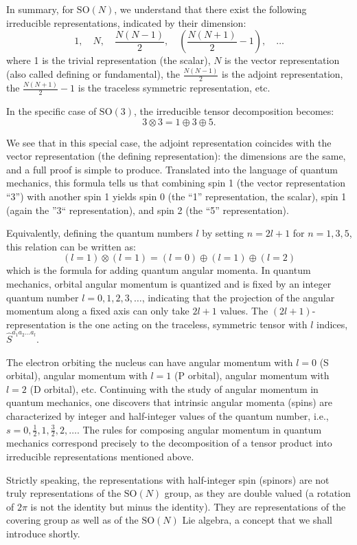 In summary, for \(\mathrm{SO}(N)\), we understand that there exist the following irreducible representations, indicated by their dimension:
\[
    1, \quad N, \quad \frac{N(N-1)}{2}, \quad \left( \frac{N(N+1)}{2} - 1 \right), \quad \ldots
\]
where 1 is the trivial representation (the scalar), \(N\) is the vector representation (also called defining or fundamental), the \(\frac{N(N-1)}{2}\) is the adjoint representation, the \(\frac{N(N+1)}{2} - 1\) is the traceless symmetric representation, etc.

\begin{example}
    In the specific case of \(\mathrm{SO}(3)\), the irreducible tensor decomposition becomes:
    \[
        3 \otimes 3 = 1 \oplus 3 \oplus 5.
    \]

    We see that in this special case, the adjoint representation coincides with the vector representation (the defining representation): the dimensions are the same, and a full proof is simple to produce. Translated into the language of quantum mechanics, this formula tells us that combining spin 1 (the vector representation ``3'') with another spin 1 yields spin 0 (the ``1'' representation, the scalar), spin 1 (again the ''3`` representation), and spin 2 (the ``5'' representation).

    Equivalently, defining the quantum numbers \(l\) by setting \(n = 2l + 1\) for \(n = 1, 3, 5\), this relation can be written as:
    \[
        (l = 1) \otimes (l = 1) = (l = 0) \oplus (l = 1) \oplus (l = 2)
    \]
    which is the formula for adding quantum angular momenta. In quantum mechanics, orbital angular momentum is quantized and is fixed by an integer quantum number \(l = 0, 1, 2, 3, \ldots\), indicating that the projection of the angular momentum along a fixed axis can only take \(2l + 1\) values. The \((2l + 1)\)-representation is the one acting on the traceless, symmetric tensor with \(l\) indices, \(\hat{S}^{a_1 a_2 \ldots a_l}\).

    The electron orbiting the nucleus can have angular momentum with \(l = 0\) (S orbital), angular momentum with \(l = 1\) (P orbital), angular momentum with \(l = 2\) (D orbital), etc. Continuing with the study of angular momentum in quantum mechanics, one discovers that intrinsic angular momenta (spins) are characterized by integer and half-integer values of the quantum number, i.e., \(s = 0, \frac{1}{2}, 1, \frac{3}{2}, 2, \ldots\). The rules for composing angular momentum in quantum mechanics correspond precisely to the decomposition of a tensor product into irreducible representations mentioned above.

    Strictly speaking, the representations with half-integer spin (spinors) are not truly representations of the \(\mathrm{SO}(N)\) group, as they are double valued (a rotation of \(2\pi\) is not the identity but minus the identity). They are representations of the covering group as well as of the \(\mathrm{SO}(N)\) Lie algebra, a concept that we shall introduce shortly.
\end{example}

